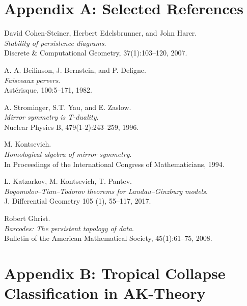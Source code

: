\documentclass[11pt]{article}
\begin{document}


\section*{Appendix A: Selected References}

\begin{thebibliography}{9}

David Cohen-Steiner, Herbert Edelsbrunner, and John Harer.\\
\textit{Stability of persistence diagrams}.\\
Discrete \& Computational Geometry, 37(1):103--120, 2007.

A. A. Beilinson, J. Bernstein, and P. Deligne.\\
\textit{Faisceaux pervers}.\\
Ast\'erisque, 100:5–171, 1982.

A. Strominger, S.T. Yau, and E. Zaslow.\\
\textit{Mirror symmetry is T-duality}.\\
Nuclear Physics B, 479(1-2):243–259, 1996.

M. Kontsevich.\\
\textit{Homological algebra of mirror symmetry}.\\
In Proceedings of the International Congress of Mathematicians, 1994.

L. Katzarkov, M. Kontsevich, T. Pantev.\\
\textit{Bogomolov–Tian–Todorov theorems for Landau–Ginzburg models}.\\
J. Differential Geometry 105 (1), 55–117, 2017.

Robert Ghrist.\\
\textit{Barcodes: The persistent topology of data}.\\
Bulletin of the American Mathematical Society, 45(1):61--75, 2008.

\end{thebibliography}





\section*{Appendix B: Tropical Collapse Classification in AK-Theory}
\end{document}
